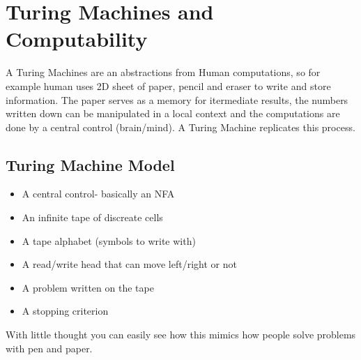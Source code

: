\section{Turing Machines and Computability}
A Turing Machines are an abstractions from Human computations, so for example human uses 2D sheet of paper, pencil and eraser to write and store information. The paper serves as a memory for itermediate results, the numbers written down can be  manipulated in a local context and the computations are done by a central control (brain/mind). A Turing Machine replicates this process.
\subsection{Turing Machine Model}
\begin{itemize}
    \item A central control- basically an NFA
    \item An infinite tape of discreate cells
    \item A tape alphabet (symbols to write with) 
    \item A read/write head that can move left/right or not
    \item A problem written on the tape
    \item A stopping criterion
\end{itemize}
With little thought you can easily see how this mimics how people solve problems with pen and paper. 
